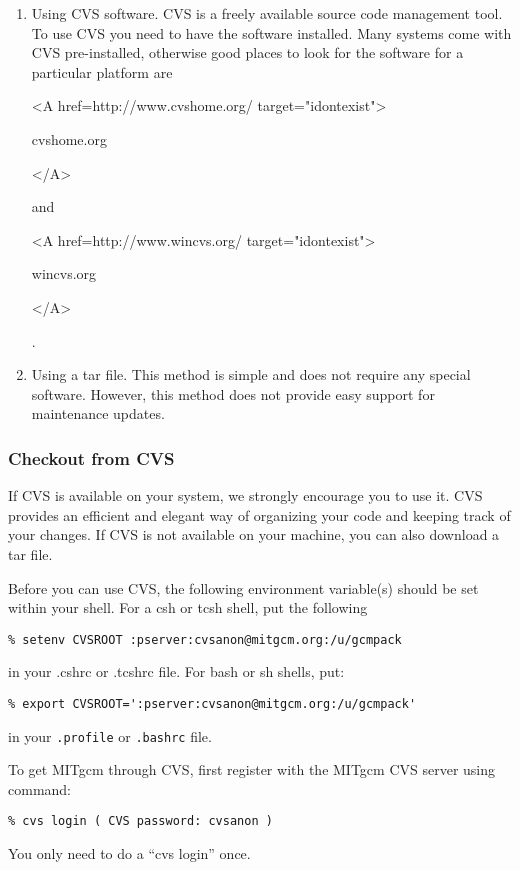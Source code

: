\begin{enumerate}
\item Using CVS software. CVS is a freely available source code management
tool. To use CVS you need to have the software installed. Many systems
come with CVS pre-installed, otherwise good places to look for
the software for a particular platform are
\begin{rawhtml} <A href=http://www.cvshome.org/ target="idontexist"> \end{rawhtml}
cvshome.org
\begin{rawhtml} </A> \end{rawhtml}
and
\begin{rawhtml} <A href=http://www.wincvs.org/ target="idontexist"> \end{rawhtml}
wincvs.org
\begin{rawhtml} </A> \end{rawhtml}
.

\item Using a tar file. This method is simple and does not
require any special software. However, this method does not
provide easy support for maintenance updates.

\end{enumerate}

\subsubsection{Checkout from CVS}
\label{sect:cvs_checkout}

If CVS is available on your system, we strongly encourage you to use it. CVS
provides an efficient and elegant way of organizing your code and keeping
track of your changes. If CVS is not available on your machine, you can also
download a tar file.

Before you can use CVS, the following environment variable(s) should
be set within your shell.  For a csh or tcsh shell, put the following 
\begin{verbatim}
% setenv CVSROOT :pserver:cvsanon@mitgcm.org:/u/gcmpack
\end{verbatim}
in your .cshrc or .tcshrc file.  For bash or sh shells, put:
\begin{verbatim}
% export CVSROOT=':pserver:cvsanon@mitgcm.org:/u/gcmpack'
\end{verbatim}
in your \texttt{.profile} or \texttt{.bashrc} file.


To get MITgcm through CVS, first register with the MITgcm CVS server
using command:
\begin{verbatim}
% cvs login ( CVS password: cvsanon )
\end{verbatim}
You only need to do a ``cvs login'' once.

